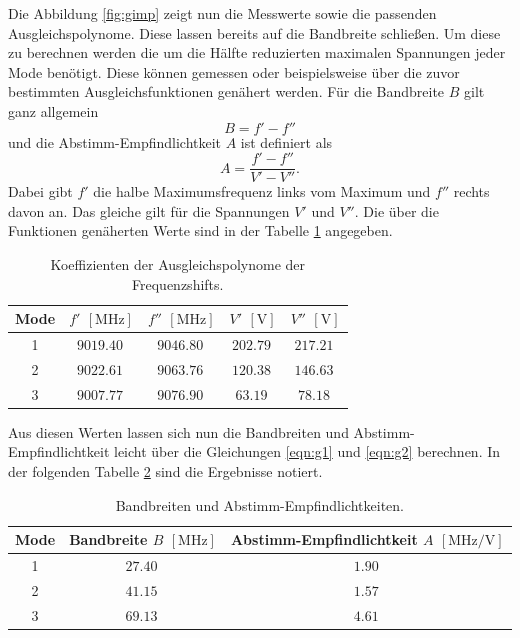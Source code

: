Die Abbildung \ref{fig:gimp} zeigt nun die Messwerte sowie die passenden Ausgleichspolynome. Diese lassen bereits auf die Bandbreite schließen. Um diese zu berechnen werden die um die Hälfte reduzierten maximalen Spannungen jeder Mode benötigt. Diese können
gemessen oder beispielsweise über die zuvor bestimmten Ausgleichsfunktionen genähert werden. Für die Bandbreite $B$ gilt ganz allgemein
\begin{equation}
    \label{eqn:g1}
B = f' - f''
\end{equation}
und die Abstimm-Empfindlichtkeit $A$ ist definiert als 
\begin{equation}
    \label{eqn:g2}
A = \frac{f' - f''}{V' - V''}.
\end{equation}
Dabei gibt $f'$ die halbe Maximumsfrequenz links vom Maximum und $f''$ rechts davon an. Das gleiche gilt für die Spannungen $V'$ und $V''$.
Die über die Funktionen genäherten Werte sind in der Tabelle \ref{tab:13} angegeben.
\begin{table}
    \centering
    \caption{Koeffizienten der Ausgleichspolynome der Frequenzshifts.} 
    \label{tab:13}
    \begin{tabular}{c || c c | c c}
        \toprule
        Mode &  $f'$ $[\si{\mega\hertz}] $& $f''$ $[\si{\mega\hertz}] $&  $V'$ $[\si{\volt}] $& $V''$ $[\si{\volt}] $ \\
        \midrule
        1      &      $\SI{9019.40}{}$      &       $\SI{9046.80}{}$              &        $\SI{202.79}{}$ &        $\SI{217.21}{}$ \\
        2      &      $\SI{9022.61}{}$      &       $\SI{9063.76}{}$              &        $\SI{120.38}{}$ &        $\SI{146.63}{}$ \\
        3      &      $\SI{9007.77}{}$      &       $\SI{9076.90}{}$              &        $\SI{63.19}{}$ &        $\SI{78.18}{}$ \\
    \end{tabular}
\end{table}
Aus diesen Werten lassen sich nun die Bandbreiten und Abstimm-Empfindlichtkeit leicht über die Gleichungen \ref{eqn:g1} und \ref{eqn:g2} berechnen. In der folgenden Tabelle \ref{tab:111} sind die Ergebnisse notiert.
\begin{table}
    \centering
    \caption{Bandbreiten und Abstimm-Empfindlichtkeiten.} 
    \label{tab:111}
    \begin{tabular}{c | c c}
        \toprule
        Mode &  Bandbreite $B$ $[\si{\mega\hertz}] $& Abstimm-Empfindlichtkeit $A$ $[\si{\mega\hertz\per\volt}]$ \\
        \midrule
        1      &      $\SI{27.40}{}$      &       $\SI{1.90}{}$              \\
        2      &      $\SI{41.15}{}$      &       $\SI{1.57}{}$              \\
        3      &      $\SI{69.13}{}$      &       $\SI{4.61}{}$               \\
    \end{tabular}
\end{table}
